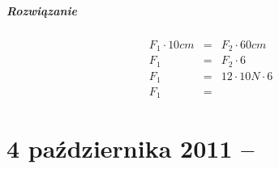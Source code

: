 \documentclass [a4paper, 11pt, oneside]{book}
\begin{document}
			\paragraph{Rozwiązanie} 
			\begin{eqnarray*}
				F_1\cdot 10cm &=& F_2\cdot 60cm\\
				F_1 &=& F_2\cdot6\\
				F_1 &=& 12\cdot10N\cdot 6\\
				F_1 &=& 
			\end{eqnarray*}
\chapter{4 października 2011 -- \textit{}} %
\label{cha:4_pa_dziernika_2011_textit}

\end{document}
